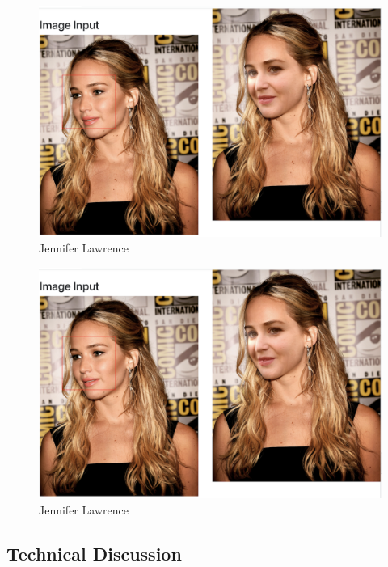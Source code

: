\begin{figure}[t]
    \centering
    \includegraphics[width=\linewidth]{Screen Shot 2022-05-09 at 4.06.05 PM.png}
    \caption{Jennifer Lawrence}
    \label{fig:result1}
\end{figure}

\begin{figure}[t]
    \centering
    \includegraphics[width=\linewidth]{Screen Shot 2022-05-09 at 4.06.05 PM.png}
    \caption{Jennifer Lawrence}
    \label{fig:result1}
\end{figure}

\subsection{Technical Discussion}

